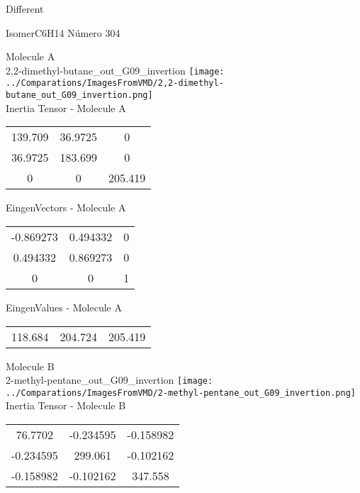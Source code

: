 \begin{center}
\vtab
\vtab
\textcolor{NavyBlue}{\Large Different}
\end{center}

 \newpage

\vtab[-2cm]
\begin{center}
{\large IsomerC6H14 \tab Número 304}
\end{center}
\begin{multicols}{2}
\begin{center}

Molecule A \\ 
2,2-dimethyl-butane\_out\_G09\_invertion
\texttt{[image: ../Comparations/ImagesFromVMD/2,2-dimethyl-butane\_out\_G09\_invertion.png]}
\\
Inertia Tensor - Molecule A \\
\vtab

\begin{tabular}{|c c c|}
139.709	 & 	36.9725	 & 	0	 \\
36.9725	 & 	183.699	 & 	0	 \\
0	 & 	0	 & 	205.419
\end{tabular}

\vtab
 EingenVectors - Molecule A     \\
\vtab
\begin{tabular}{|c c c|}
-0.869273	 & 	0.494332	 & 	0	 \\
0.494332	 & 	0.869273	 & 	0	 \\
0	 & 	0	 & 	1
\end{tabular}

\vtab
 EingenValues - Molecule A     \\
\vtab
\begin{tabular}{|c c c|}
118.684	 & 	204.724	 & 	205.419	 \\
\end{tabular}
\columnbreak

Molecule B \\ 
2-methyl-pentane\_out\_G09\_invertion
\texttt{[image: ../Comparations/ImagesFromVMD/2-methyl-pentane\_out\_G09\_invertion.png]}
\\
Inertia Tensor - Molecule B \\
\vtab

\begin{tabular}{|c c c|}
76.7702	 & 	-0.234595	 & 	-0.158982	 \\
-0.234595	 & 	299.061	 & 	-0.102162	 \\
-0.158982	 & 	-0.102162	 & 	347.558
\end{tabular}


\end{center}
\end{multicols}
